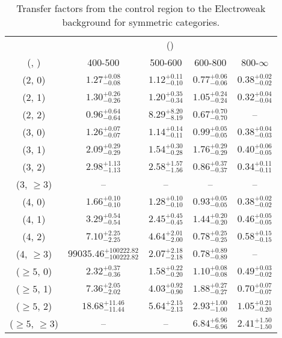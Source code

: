 \begin{table}[h!]
\tiny
\centering
\caption{Transfer factors from the \gj control region to the Electroweak background for symmetric categories.\label{tab:tf_gj_total_sym}}
\begin{tabular}
{ccccc}
	\hline\hline
	& \multicolumn{4}{c}{\scalht (\gev)} \\ 
	 (\njet,  \nb) & 400-500 & 500-600 & 600-800 & 800-$\infty$ \\ [0.8ex] 
\hline
	(2, 0) & $1.27^{+ 0.08 }_{- 0.08 }$ & $1.12^{+ 0.11 }_{- 0.10 }$ & $0.77^{+ 0.06 }_{- 0.06 }$ & $0.38^{+ 0.02 }_{- 0.02 }$ \\[0.5ex] 
	(2, 1) & $1.30^{+ 0.26 }_{- 0.26 }$ & $1.20^{+ 0.35 }_{- 0.34 }$ & $1.05^{+ 0.24 }_{- 0.24 }$ & $0.32^{+ 0.04 }_{- 0.04 }$ \\[0.5ex] 
	(2, 2) & $0.96^{+ 0.64 }_{- 0.64 }$ & $8.29^{+ 8.20 }_{- 8.19 }$ & $0.67^{+ 0.70 }_{- 0.70 }$ & -- \\[0.5ex] 
	(3, 0) & $1.26^{+ 0.07 }_{- 0.07 }$ & $1.14^{+ 0.14 }_{- 0.11 }$ & $0.99^{+ 0.05 }_{- 0.05 }$ & $0.38^{+ 0.04 }_{- 0.03 }$ \\[0.5ex] 
	(3, 1) & $2.09^{+ 0.29 }_{- 0.29 }$ & $1.54^{+ 0.30 }_{- 0.28 }$ & $1.76^{+ 0.29 }_{- 0.29 }$ & $0.40^{+ 0.06 }_{- 0.05 }$ \\[0.5ex] 
	(3, 2) & $2.98^{+ 1.13 }_{- 1.13 }$ & $2.58^{+ 1.57 }_{- 1.56 }$ & $0.86^{+ 0.37 }_{- 0.37 }$ & $0.34^{+ 0.11 }_{- 0.11 }$ \\[0.5ex] 
	(3, $\ge3$) & -- & -- & -- & -- \\[0.5ex] 
	(4, 0) & $1.66^{+ 0.10 }_{- 0.10 }$ & $1.28^{+ 0.10 }_{- 0.10 }$ & $0.93^{+ 0.05 }_{- 0.05 }$ & $0.38^{+ 0.02 }_{- 0.02 }$ \\[0.5ex] 
	(4, 1) & $3.29^{+ 0.54 }_{- 0.54 }$ & $2.45^{+ 0.45 }_{- 0.45 }$ & $1.44^{+ 0.20 }_{- 0.20 }$ & $0.46^{+ 0.05 }_{- 0.05 }$ \\[0.5ex] 
	(4, 2) & $7.10^{+ 2.25 }_{- 2.25 }$ & $4.64^{+ 2.01 }_{- 2.00 }$ & $0.78^{+ 0.25 }_{- 0.25 }$ & $0.58^{+ 0.15 }_{- 0.15 }$ \\[0.5ex] 
	(4, $\ge3$) & $99035.46^{+ 100222.82 }_{- 100222.82 }$ & $2.07^{+ 2.18 }_{- 2.18 }$ & $0.78^{+ 0.89 }_{- 0.89 }$ & -- \\[0.5ex] 
	($\ge5$, 0) & $2.32^{+ 0.37 }_{- 0.36 }$ & $1.58^{+ 0.22 }_{- 0.20 }$ & $1.10^{+ 0.08 }_{- 0.08 }$ & $0.49^{+ 0.03 }_{- 0.02 }$ \\[0.5ex] 
	($\ge5$, 1) & $7.36^{+ 2.05 }_{- 2.02 }$ & $4.03^{+ 0.92 }_{- 0.90 }$ & $1.88^{+ 0.27 }_{- 0.27 }$ & $0.70^{+ 0.07 }_{- 0.07 }$ \\[0.5ex] 
	($\ge5$, 2) & $18.68^{+ 11.46 }_{- 11.44 }$ & $5.64^{+ 2.15 }_{- 2.13 }$ & $2.93^{+ 1.00 }_{- 1.00 }$ & $1.05^{+ 0.21 }_{- 0.20 }$ \\[0.5ex] 
	($\ge5$, $\ge3$) & -- & -- & $6.84^{+ 6.96 }_{- 6.96 }$ & $2.41^{+ 1.50 }_{- 1.50 }$ \\[0.5ex] 
	\hline
	\hline
\end{tabular}
\end{table}
